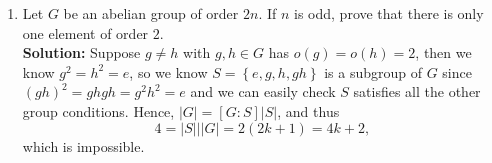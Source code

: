 \documentclass[a4paper,12pt]{article}
\begin{document}
\begin{enumerate}
    \bigskip

    \item Let $G$ be an abelian group of order $2n$. If $n$ is odd, prove that there is only one element of order $2$. \\
    \textbf{Solution:} Suppose \(g \neq h\) with \(g, h \in G\) has \(o(g) = o(h) = 2\), then we know \(g^2 = h^2 = e\), so we know \(S = \left\{ e, g, h, gh \right\} \) is a subgroup of \(G\) since \((gh)^2 = ghgh=g^2h^2=e\) and we can easily check \(S\) satisfies all the other group conditions. Hence, \(\vert G \vert = [G: S] \vert S \vert \), and thus 
    \[
        4 = \vert S \vert \mid \vert G \vert = 2(2k + 1) = 4k + 2,
    \] which is impossible.
\end{enumerate}
\end{document}
